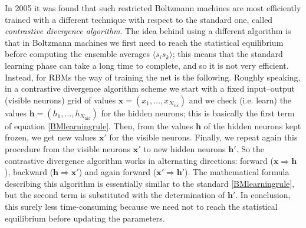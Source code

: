 In 2005 it was found that such restricted Boltzmann machines are most efficiently trained with a different technique with respect to the standard one, called \emph{contrastive divergence algorithm}. The idea behind using a different algorithm is that in Boltzmann machines we first need to reach the statistical equilibrium before computing the ensemble averages $\langle s_is_k\rangle$; this means that the standard learning phase can take a long time to complete, and so it is not very efficient. Instead, for RBMs the way of training the net is the following. Roughly speaking, in a contrastive divergence algorithm scheme we start with a fixed input--output (visible neurons) grid of values $\mathbf{x}=(x_1,\ldots,x_{N_{\text{vis}}})$ and we check (i.e. learn) the values $\mathbf{h}=(h_1,\ldots,h_{N_{\text{hid}}})$ for the hidden neurons; this is basically the first term of equation \eqref{BMlearningrule}. Then, from the values $\mathbf{h}$ of the hidden neurons kept frozen, we get new values $\mathbf{x}'$ for the visible neurons. Finally, we repeat again this procedure from the visible neurons $\mathbf{x}'$ to new hidden neurons $\mathbf{h}'$. So the contrastive divergence algorithm works in alternating directions: forward ($\mathbf{x}\Rightarrow\mathbf{h}$), backward ($\mathbf{h}\Rightarrow\mathbf{x}'$) and again forward ($\mathbf{x}'\Rightarrow\mathbf{h}'$). The mathematical formula describing this algorithm is essentially similar to the standard \eqref{BMlearningrule}, but the second term is substituted with the determination of $\mathbf{h}'$. In conclusion, this surely less time-consuming because we need not to reach the statistical equilibrium before updating the parameters.

